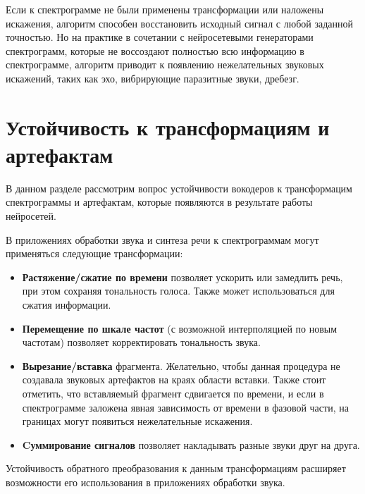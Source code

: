 Если к спектрограмме не были применены трансформации или наложены искажения, алгоритм способен восстановить исходный сигнал с любой заданной точностью.
Но на практике в сочетании с нейросетевыми генераторами спектрограмм, которые не воссоздают полностью всю информацию в спектрограмме, 
алгоритм приводит к появлению нежелательных звуковых искажений, 
таких как эхо, вибрирующие паразитные звуки, дребезг. 


\section{Устойчивость к трансформациям и артефактам}

В данном разделе рассмотрим вопрос устойчивости вокодеров к трансформацим спектрограммы и артефактам, которые появляются в результате работы нейросетей.

В приложениях обработки звука и синтеза речи к спектрограммам могут применяться следующие трансформации:
\begin{itemize}
  \item \textbf{Растяжение/сжатие по времени} позволяет ускорить или замедлить речь, при этом сохраняя тональность голоса. Также может использоваться для сжатия информации.
  \item \textbf{Перемещение по шкале частот} (с возможной интерполяцией по новым частотам) позволяет корректировать тональность звука.
  \item \textbf{Вырезание/вставка} фрагмента. Желательно, чтобы данная процедура не создавала звуковых артефактов на краях области вставки. 
  Также стоит отметить, что вставляемый фрагмент сдвигается по времени, и если в спектрограмме заложена явная зависимость от времени в фазовой части, 
  на границах могут появиться нежелательные искажения.
  \item \textbf{Cуммирование сигналов} позволяет накладывать разные звуки друг на друга.
\end{itemize}
Устойчивость обратного преобразования к данным трансформациям расширяет возможности его использования в приложениях обработки звука.

